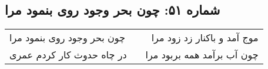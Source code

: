 \begin{center}
\section*{شماره ۵۱: چون بحر وجود روی بنمود مرا}
\label{sec:051}
\begin{longtable}{l p{0.5cm} r}
چون بحر وجود روی بنمود مرا
&&
موج آمد و باکنار زد زود مرا
\\
در چاه حدوث کار کردم عمری
&&
چون آب برآمد همه بربود مرا
\\
\end{longtable}
\end{center}
